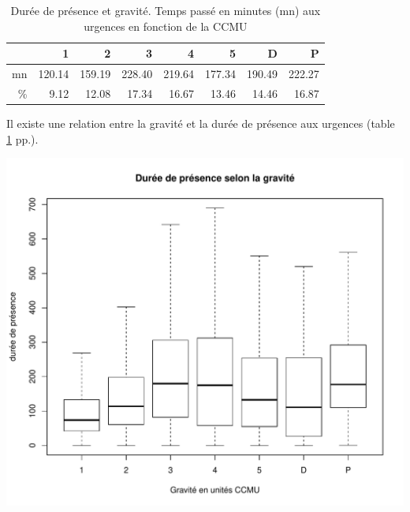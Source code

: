 \documentclass[12pt,english,french,twoside]{book}\usepackage[]{graphicx}\usepackage[]{color}
\makeatletter
\def\maxwidth{ %
  \ifdim\Gin@nat@width>\linewidth
    \linewidth
  \else
    \Gin@nat@width
  \fi
}
\newenvironment{knitrout}{}{} %
\makeatother
\begin{document}
\begin{table}[ht]
\centering
\begin{tabular}{rrrrrrrr}
  \hline
 & 1 & 2 & 3 & 4 & 5 & D & P \\ 
  \hline
mn & 120.14 & 159.19 & 228.40 & 219.64 & 177.34 & 190.49 & 222.27 \\ 
  \% & 9.12 & 12.08 & 17.34 & 16.67 & 13.46 & 14.46 & 16.87 \\ 
   \hline
\end{tabular}
\caption[Durée de présence et gravité]{Durée de présence et gravité. Temps passé en minutes (mn) aux urgences en fonction de la CCMU} 
\label{duree_gravite}
\end{table}


Il existe une relation entre la gravité et la durée de présence aux urgences (table \ref{duree_gravite} pp.\pageref{duree_gravite}).

 \begin{center}
\begin{knitrout}
\color{fgcolor}
\includegraphics[width=\maxwidth]{figure/duree_gravite2} 

\end{knitrout}

 \label{toucan}
\end{center}
\end{document}
